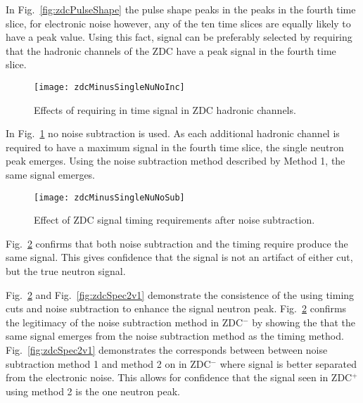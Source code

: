       In Fig.~\ref{fig:zdcPulseShape} the pulse shape peaks in the peaks in the
        fourth time slice, for electronic noise however, any of the ten time 
        slices are equally likely to have a peak value.
      Using this fact, signal can be preferably selected by requiring that the
        hadronic channels of the ZDC have a peak signal in the fourth time 
        slice.
      \begin{figure}[h]
        \centering
        \texttt{[image: zdcMinusSingleNuNoInc]}
        \caption{Effects of requiring in time signal in ZDC hadronic 
          channels.}
        \label{fig:zdcTimingCuts}
      \end{figure}
      In Fig.~\ref{fig:zdcTimingCuts} no noise subtraction is used. 
      As each additional hadronic channel is required to have a maximum signal
        in the fourth time slice, the single neutron peak emerges. 
      Using the noise subtraction method described by Method 1, the same signal
        emerges.
      \begin{figure}[h]
        \centering
        \texttt{[image: zdcMinusSingleNuNoSub]}
        \caption{Effect of ZDC signal timing requirements after noise 
          subtraction.}
        \label{fig:zdcTimingAfterNoiseSub}
      \end{figure}
      Fig.~\ref{fig:zdcTimingAfterNoiseSub} confirms that both noise 
        subtraction and the timing require produce the same signal.
      This gives confidence that the signal is not an artifact of either cut, 
        but the true neutron signal. 

      Fig.~\ref{fig:zdcTimingAfterNoiseSub} and Fig.~\ref{fig:zdcSpec2v1} 
        demonstrate the consistence of the using timing cuts and noise 
        subtraction to enhance the signal neutron peak. 
      Fig.~\ref{fig:zdcTimingAfterNoiseSub} confirms the legitimacy of the 
        noise subtraction method in ZDC$^{-}$ by showing the that the same signal
        emerges from the noise subtraction method as the timing method.
      Fig.~\ref{fig:zdcSpec2v1} demonstrates the corresponds between between
        noise subtraction method 1 and method 2 on in ZDC$^{-}$ where signal is 
        better separated from the electronic noise. 
      This allows for confidence that the signal seen in ZDC$^{+}$ using method 2 
        is the one neutron peak.

